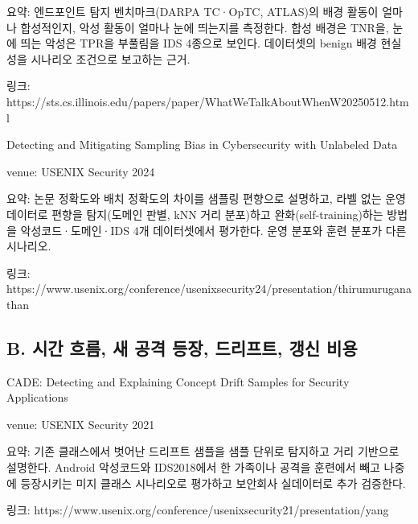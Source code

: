 \par\noindent \textbullet\enspace 요약: 엔드포인트 탐지 벤치마크(DARPA TC·OpTC, ATLAS)의 배경 활동이 얼마나 합성적인지, 악성 활동이 얼마나 눈에 띄는지를 측정한다. 합성 배경은 TNR을, 눈에 띄는 악성은 TPR을 부풀림을 IDS 4종으로 보인다. 데이터셋의 benign 배경 현실성을 시나리오 조건으로 보고하는 근거.


\par\noindent \textbullet\enspace 링크: https:/\allowbreak{}/\allowbreak{}sts.cs.illinois.edu/\allowbreak{}papers/\allowbreak{}paper/\allowbreak{}WhatWeTalkAboutWhenW20250512.html


\par\noindent \textbullet\enspace Detecting and Mitigating Sampling Bias in Cybersecurity with Unlabeled Data


\par\noindent \textbullet\enspace venue: USENIX Security 2024


\par\noindent \textbullet\enspace 요약: 논문 정확도와 배치 정확도의 차이를 샘플링 편향으로 설명하고, 라벨 없는 운영 데이터로 편향을 탐지(도메인 판별, kNN 거리 분포)하고 완화(self-training)하는 방법을 악성코드·도메인·IDS 4개 데이터셋에서 평가한다. 운영 분포와 훈련 분포가 다른 시나리오.


\par\noindent \textbullet\enspace 링크: https:/\allowbreak{}/\allowbreak{}www.usenix.org/\allowbreak{}conference/\allowbreak{}usenixsecurity24/\allowbreak{}presentation/\allowbreak{}thirumuruganathan


\subsection{B. 시간 흐름, 새 공격 등장, 드리프트, 갱신 비용}
\par\noindent \textbullet\enspace CADE: Detecting and Explaining Concept Drift Samples for Security Applications


\par\noindent \textbullet\enspace venue: USENIX Security 2021


\par\noindent \textbullet\enspace 요약: 기존 클래스에서 벗어난 드리프트 샘플을 샘플 단위로 탐지하고 거리 기반으로 설명한다. Android 악성코드와 IDS2018에서 한 가족이나 공격을 훈련에서 빼고 나중에 등장시키는 미지 클래스 시나리오로 평가하고 보안회사 실데이터로 추가 검증한다.


\par\noindent \textbullet\enspace 링크: https:/\allowbreak{}/\allowbreak{}www.usenix.org/\allowbreak{}conference/\allowbreak{}usenixsecurity21/\allowbreak{}presentation/\allowbreak{}yang


